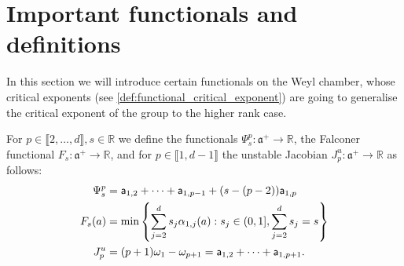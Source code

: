 \documentclass{report}
\begin{document}
\section{Important functionals and definitions}
In this section we will introduce certain functionals on the Weyl chamber, whose critical exponents (see \cref{def:functional_critical_exponent}) are going to generalise the critical exponent of the group to the higher rank case.
\begin{definition}\label{def:functionals}
For $p \in \llbracket 2, \ldots, d \rrbracket, s\in \mathbb R $
we define the functionals $\Psi_s^p: \mathfrak a^+ \to \mathbb R$, the Falconer functional $F_s: \mathfrak a^+ \to \mathbb R$, and for $p \in \llbracket 1, d-1 \rrbracket$ the unstable Jacobian $J_p^u: \mathfrak a^+ \to \mathbb R$ as follows:
\begin{align*}
\Psi_s^p &= 
    {\sf a}_{1,2} + \cdots + {\sf a}_{1,p-1} + (s - (p-2)){\sf a}_{1,p}\\
F_s(a) &= \min 
    \left\{
        \sum_{j=2}^d s_j \alpha_{1,j}(a) : s_j \in (0,1], \sum_{j=2}^d s_j = s 
    \right\}\\
J_p^u &= (p+1)\omega_1 - \omega_{p+1} =
{\sf a}_{1,2} + \cdots + {\sf a}_{1,p+1}.
\end{align*}
\end{definition}
\end{document}
